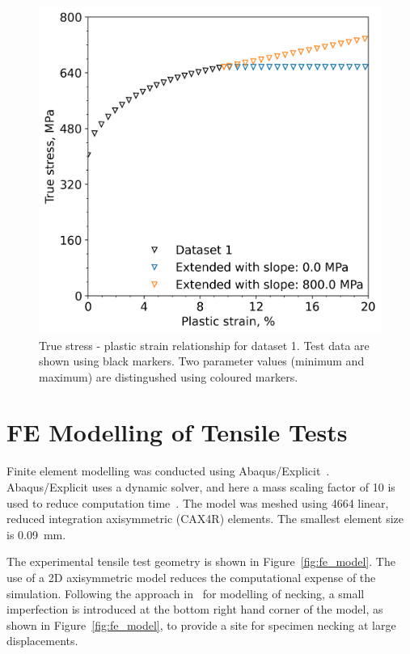 \documentclass[preprint, review, 12pt]{elsarticle}
\begin{document}
	\begin{figure}[!htbp]
		\centering
		\includegraphics[width=\linewidth, height=0.4\textheight, keepaspectratio]{ABAQUS_SLOPE_COMPARISON}
		\caption{True stress - plastic strain relationship for dataset 1. Test data are shown using black markers. Two parameter values (minimum and maximum) are distingushed using coloured markers.}
		\label{fig:extending_uts}
	\end{figure}

	\section{FE Modelling of Tensile Tests}
	\label{h:fem}

	Finite element modelling was conducted using Abaqus/Explicit~\cite{DASSAULT2021}.
	Abaqus/Explicit uses a dynamic solver, and here a mass scaling factor of 10 is used to reduce computation time~\cite{DASSAULT2021}.
	The model was meshed using 4664 linear, reduced integration axisymmetric (CAX4R) elements.
	The smallest element size is 0.09~mm.

	The experimental tensile test geometry is shown in Figure~\ref{fig:fe_model}.
	The use of a 2D axisymmetric model reduces the computational expense of the simulation.
	Following the approach in~\cite{DASSAULT2021} for modelling of necking, a small imperfection is introduced at the bottom right hand corner of the model, as shown in Figure~\ref{fig:fe_model}, to provide a site for specimen necking at large displacements.
\end{document}
